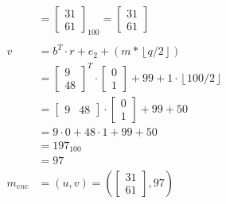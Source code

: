 \begin{align*}
          & = \begin{bmatrix}
                31 \\ 
                61 
              \end{bmatrix}_{100}
  = 
  \begin{bmatrix}
    31 \\
    61
  \end{bmatrix}                                                    \\
  \\
  v       & = b^T \cdot r + e_2 + (m*\left\lfloor q/2\right\rfloor) \\
          & =\begin{bmatrix}
               9 \\
               48
             \end{bmatrix}^T
  \cdot
  \begin{bmatrix}
    0 \\
    1
  \end{bmatrix}
  + 99 + 1 \cdot \left\lfloor 100/2\right\rfloor                    \\
          & =\begin{bmatrix}
               9 & 48
             \end{bmatrix}
  \cdot
  \begin{bmatrix}
    0 \\ 
    1 
  \end{bmatrix}
  + 99 + 50                                                         \\
          & = 9 \cdot 0 +48 \cdot 1 + 99 + 50                       \\
          & = 197_{100}                                             \\
          & = 97                                                    \\
  m_{enc} & = (u, v) = \left (
  \begin{bmatrix}
      31 \\
      61
    \end{bmatrix}, 97   \right )                                      \\
\end{align*}


